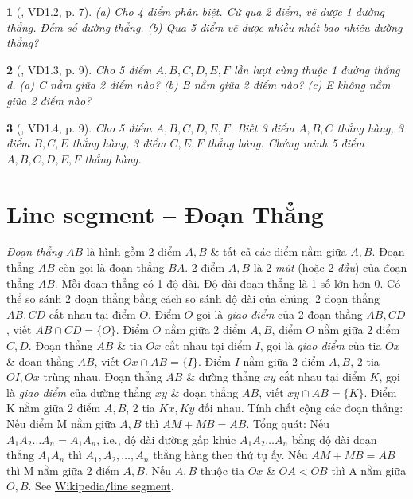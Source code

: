 \documentclass{article}
\newtheorem{baitoan}{}
\begin{document}
\begin{baitoan}[\cite{TLCT_THCS_Toan_6_hinh_hoc}, VD1.2, p. 7]
	(a) Cho 4 điểm phân biệt. Cứ qua 2 điểm, vẽ được 1 đường thẳng. Đếm số đường thẳng. (b) Qua 5 điểm vẽ được nhiều nhất bao nhiêu đường thẳng?
\end{baitoan}

\begin{baitoan}[\cite{TLCT_THCS_Toan_6_hinh_hoc}, VD1.3, p. 9]
	Cho 5 điểm $A,B,C,D,E,F$ lần lượt cùng thuộc 1 đường thẳng d. (a) C nằm giữa 2 điểm nào? (b) B nằm giữa 2 điểm nào? (c) E không nằm giữa 2 điểm nào?
\end{baitoan}

\begin{baitoan}[\cite{TLCT_THCS_Toan_6_hinh_hoc}, VD1.4, p. 9]
	Cho 5 điểm $A,B,C,D,E,F$. Biết 3 điểm $A,B,C$ thẳng hàng, 3 điểm $B,C,E$ thẳng hàng, 3 điểm $C,E,F$ thẳng hàng. Chứng minh 5 điểm $A,B,C,D,E,F$ thẳng hàng.
\end{baitoan}


\section{Line segment -- Đoạn Thẳng}
 \textit{Đoạn thẳng} $AB$ là hình gồm 2 điểm $A,B$ \& tất cả các điểm nằm giữa $A,B$. Đoạn thẳng $AB$ còn gọi là đoạn thẳng $BA$. 2 điểm $A,B$ là 2 \textit{mút} (hoặc 2 \textit{đầu}) của đoạn thẳng $AB$. Mỗi đoạn thẳng có 1 độ dài. Độ dài đoạn thẳng là 1 số lớn hơn $0$.  Có thể so sánh 2 đoạn thẳng bằng cách so sánh độ dài của chúng.  2 đoạn thẳng $AB,CD$ cắt nhau tại điểm $O$. Điểm $O$ gọi là \textit{giao điểm} của 2 đoạn thẳng $AB,CD$, viết $AB\cap CD = \{O\}$. Điểm $O$ nằm giữa 2 điểm $A,B$, điểm $O$ nằm giữa 2 điểm $C,D$.  Đoạn thẳng $AB$ \& tia $Ox$ cắt nhau tại điểm $I$, gọi là \textit{giao điểm} của tia $Ox$ \& đoạn thẳng $AB$, viết $Ox\cap AB = \{I\}$. Điểm $I$ nằm giữa 2 điểm $A,B$, 2 tia $OI,Ox$ trùng nhau.  Đoạn thẳng $AB$ \& đường thẳng $xy$ cắt nhau tại điểm $K$, gọi là \textit{giao điểm} của đường thẳng $xy$ \& đoạn thẳng $AB$, viết $xy\cap AB = \{K\}$. Điểm K nằm giữa 2 điểm $A,B$, 2 tia $Kx,Ky$ đối nhau.  {\sf Tính chất cộng các đoạn thẳng}: Nếu điểm M nằm giữa $A,B$ thì $AM + MB = AB$. Tổng quát: Nếu $A_1A_2\ldots A_n = A_1A_n$, i.e., độ dài đường gấp khúc $A_1A_2\ldots A_n$ bằng độ dài đoạn thẳng $A_1A_n$ thì $A_1,A_2,\ldots,A_n$ thẳng hàng theo thứ tự ấy. Nếu $AM + MB = AB$ thì M nằm giữa 2 điểm $A,B$. Nếu $A,B$ thuộc tia $Ox$ \& $OA < OB$ thì A nằm giữa $O,B$. See \href{https://en.wikipedia.org/wiki/Line_segment}{Wikipedia{\tt/}line segment}.
\end{document}
